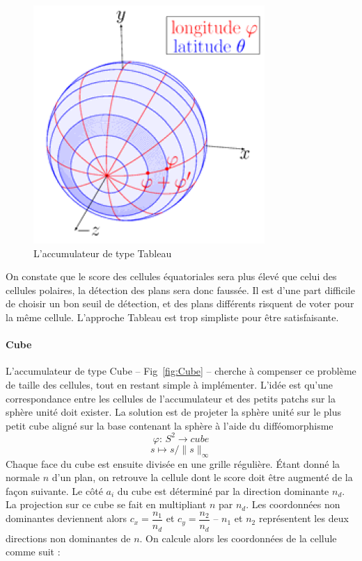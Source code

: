 ﻿\documentclass[12pt, twoside]{article}
\begin{document}
\begin{figure}[h]
\centering
\includegraphics[scale=0.65]{Array.png}
\caption{\label{fig:Array} L'accumulateur de type Tableau}
\end{figure}

On constate que le score des cellules équatoriales sera plus élevé que celui des cellules polaires, la détection des plans sera donc faussée. Il est d’une part difficile de choisir un bon seuil de détection, et des plans différents risquent de voter pour la même cellule. L’approche Tableau est trop simpliste pour être satisfaisante.

\paragraph{Cube}
L’accumulateur de type Cube -- Fig~\ref{fig:Cube} -- cherche à compenser ce problème de taille des cellules, tout en restant simple à implémenter. L’idée est qu’une correspondance entre les cellules de l’accumulateur et des petits patchs sur la sphère unité doit exister. La solution est de projeter la sphère unité sur le plus petit cube aligné sur la base contenant la sphère à l’aide du difféomorphisme
$$\varphi \text{: } S^2 \rightarrow cube$$
$$s \mapsto s/\lVert s\rVert_{\infty}$$
Chaque face du cube est ensuite divisée en une grille régulière. Étant donné la normale $n$ d’un plan, on retrouve la cellule dont le score doit être augmenté de la façon suivante. Le côté $a_i$ du cube est déterminé par la direction dominante $n_d$. La projection sur ce cube se fait en multipliant $n$ par $n_d$. Les coordonnées non dominantes deviennent alors $c_x =
\dfrac{n_1}{n_d}$ et $c_y = \dfrac{n_2}{n_d}$ -- $n_1$ et $n_2$ représentent les deux directions non dominantes de $n$. On calcule alors les coordonnées de la cellule comme suit :
\end{document}
